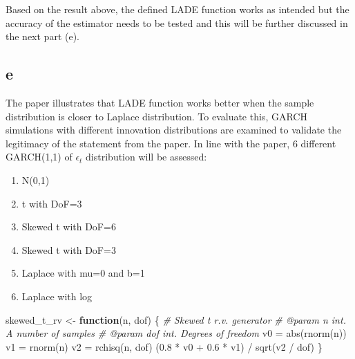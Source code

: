\documentclass[
  11pt,
]{article}
\newenvironment{Shaded}{\begin{snugshade}}{\end{snugshade}}
\newcommand{\CommentTok}[1]{\textcolor[rgb]{0.56,0.35,0.01}{\textit{#1}}}
\newcommand{\ControlFlowTok}[1]{\textcolor[rgb]{0.13,0.29,0.53}{\textbf{#1}}}
\newcommand{\FloatTok}[1]{\textcolor[rgb]{0.00,0.00,0.81}{#1}}
\newcommand{\FunctionTok}[1]{\textcolor[rgb]{0.00,0.00,0.00}{#1}}
\newcommand{\NormalTok}[1]{#1}
\newcommand{\OtherTok}[1]{\textcolor[rgb]{0.56,0.35,0.01}{#1}}
\newcommand{\SpecialCharTok}[1]{\textcolor[rgb]{0.00,0.00,0.00}{#1}}
\providecommand{\tightlist}{%
  \setlength{\itemsep}{0pt}\setlength{\parskip}{0pt}}
\begin{document}
Based on the result above, the defined LADE function works as intended
but the accuracy of the estimator needs to be tested and this will be
further discussed in the next part (e).

\hypertarget{e}{%
\subsection{e}\label{e}}

The paper illustrates that LADE function works better when the sample
distribution is closer to Laplace distribution. To evaluate this, GARCH
simulations with different innovation distributions are examined to
validate the legitimacy of the statement from the paper. In line with
the paper, 6 different GARCH(1,1) of \(\epsilon_t\) distribution will be
assessed:

\begin{enumerate}
\def\labelenumi{\arabic{enumi}.}
\tightlist
\item
  N(0,1)
\item
  t with DoF=3
\item
  Skewed t with DoF=6
\item
  Skewed t with DoF=3
\item
  Laplace with mu=0 and b=1
\item
  Laplace with log
\end{enumerate}

\begin{Shaded}
\begin{Highlighting}[]
\NormalTok{skewed\_t\_rv }\OtherTok{\textless{}{-}} \ControlFlowTok{function}\NormalTok{(n, dof) \{}
  \CommentTok{\#\textquotesingle{} Skewed t r.v. generator}
  \CommentTok{\#\textquotesingle{} @param n int. A number of samples}
  \CommentTok{\#\textquotesingle{} @param dof int. Degrees of freedom}
\NormalTok{  v0 }\OtherTok{=} \FunctionTok{abs}\NormalTok{(}\FunctionTok{rnorm}\NormalTok{(n))}
\NormalTok{  v1 }\OtherTok{=} \FunctionTok{rnorm}\NormalTok{(n)}
\NormalTok{  v2 }\OtherTok{=} \FunctionTok{rchisq}\NormalTok{(n, dof)}
\NormalTok{  (}\FloatTok{0.8} \SpecialCharTok{*}\NormalTok{ v0 }\SpecialCharTok{+} \FloatTok{0.6} \SpecialCharTok{*}\NormalTok{ v1) }\SpecialCharTok{/} \FunctionTok{sqrt}\NormalTok{(v2 }\SpecialCharTok{/}\NormalTok{ dof)}
\NormalTok{\}}
\end{Highlighting}
\end{Shaded}
\end{document}
